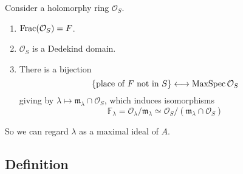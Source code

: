 \documentclass{article}
\newcommand{\F}{\mathbb{F}}
\renewcommand{\O}{\mathcal{O}}
\newcommand{\m}{\mathfrak{m}}
\begin{document}
\begin{proposition}
Consider a holomorphy ring $\O_S$.
\begin{enumerate}[(1)]
    \item $\Frac(\O_S) = F$.
    \item $\O_S$ is a Dedekind domain.
    \item There is a bijection \[\{\text{place of }F\text{ not in }S\}\longleftrightarrow \spm \O_S\] giving by $\lambda\mapsto \m_\lambda\cap\O_S$, which induces isomorphisms \[\F_\lambda = \O_\lambda/\m_\lambda\simeq \O_S/(\m_\lambda\cap\O_S)\]
\end{enumerate}
\end{proposition}
So we can regard $\lambda$ as a maximal ideal of $A$.

\subsection{Definition}
\end{document}
